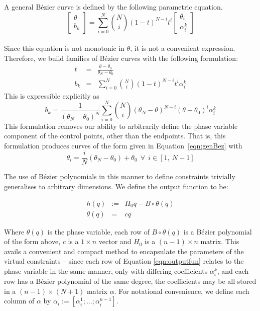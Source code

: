 A general Bézier curve is defined by the following parametric equation.
\begin{equation}
	\begin{bmatrix}
		\theta \\ b_k
	\end{bmatrix}
	=
	\sum_{i=0}^{N}\binom{N}{i}\left(1-t\right)^{N-i}t^i
	\begin{bmatrix}
		\theta_i \\ \alpha^k_i
	\end{bmatrix} \label{eqn:genBez}
\end{equation} \\
Since this equation is not monotonic in $\theta$, it is not a convenient expression. Therefore, we build families of Bézier curves with the following formulation:
\begin{eqnarray}
	t &=& \frac{\theta - \theta_0}{\theta_N - \theta_0} \\
	b_k &=& \sum_{i=0}^{N}\binom{N}{i}\left(1-t\right)^{N-i}t^i\alpha^k_i
\end{eqnarray}
This is expressible explicitly as
\begin{equation}
	b_k = \frac{1}{\left(\theta_N - \theta_0\right)^N}\sum_{i=0}^{N}\binom{N}{i}
		\left(\theta_N - \theta\right)^{N-i}
		\left(\theta - \theta_0\right)^i\alpha^k_i \label{eqn:expBez}
\end{equation}
This formulation removes our ability to arbitrarily define the phase variable component of the control points, other than the endpoints. That is, this formulation produces curves of the form given in Equation~\ref{eqn:genBez} with
\begin{equation}
	\theta_i = \frac{i}{N}\left(\theta_N-\theta_0\right) + \theta_0 ~~
	\forall ~~ i \in \left[1,~N-1\right]
\end{equation}

The use of Bézier polynomials in this manner to define constraints trivially generalises to arbitrary dimensions. We define the output function to be:

\begin{eqnarray} 
	h(q) &:=& H_0 q - B \circ \theta(q) \label{eqn:outputfun} \\
	\theta(q) &=& cq
\end{eqnarray}

Where $\theta(q)$ is the phase variable, each row of $B\circ\theta(q)$ is a Bézier polynomial of the form above, $c$ is a $1\times n$ vector and $H_0$ is a $(n-1)\times n$ matrix. This avails a convenient and compact method to encapsulate the parameters of the virtual constraints -- since each row of Equation \ref{eqn:outputfun} relates to the phase variable in the same manner, only with differing coefficients $\alpha_i^k$, and each row has a Bézier polynomial of the same degree, the coefficients may be all stored in a $(n-1)\times(N+1)$ matrix $\alpha$. For notational convenience, we define each column of $\alpha$ by $\alpha_i := [\alpha_i^1; \ldots; \alpha_i^{n-1}]$. \\

